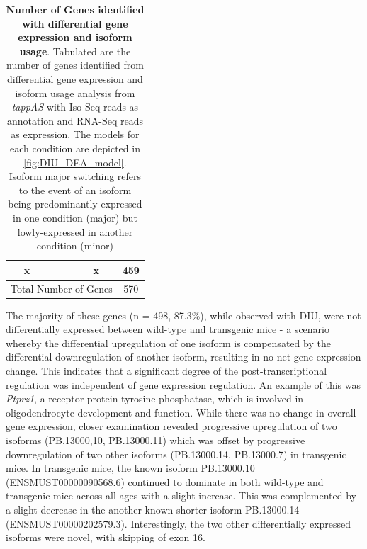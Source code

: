 \begin{table}[!htp]
\begin{tabularx}{0.85\textwidth}{cccc}
		x                                                                       & \checkmark                                                                    & x                                                                  & 459                              \\ \midrule
		\multicolumn{3}{c}{Total Number of Genes}                                                                                                                                                                            & 570                              \\ \bottomrule
	\end{tabularx}
	\caption[Number of Genes identified with differential gene expression and isoform usage]%
	{\textbf{Number of Genes identified with differential gene expression and isoform usage}. Tabulated are the number of genes identified from differential gene expression and isoform usage analysis from \textit{tappAS} with Iso-Seq reads as annotation and RNA-Seq reads as expression. The models for each condition are depicted in \cref{fig:DIU_DEA_model}. Isoform major switching refers to the event of an isoform being predominantly expressed in one condition (major) but lowly-expressed in another condition (minor)}
	\label{tab:DIU_DEA_nums}
\end{table}

The majority of these genes (n = 498, 87.3\%), while observed with DIU, were not differentially expressed between wild-type and transgenic mice - a scenario whereby the differential upregulation of one isoform is compensated by the differential downregulation of another isoform, resulting in no net gene expression change. This indicates that a significant degree of the post-transcriptional regulation was independent of gene expression regulation. An example of this was \textit{Ptprz1}, a receptor protein tyrosine phosphatase, which is involved in oligodendrocyte development and function. While there was no change in overall gene expression, closer examination revealed progressive upregulation of two isoforms (PB.13000,10, PB.13000.11) which was offset by progressive downregulation of two other isoforms (PB.13000.14, PB.13000.7) in transgenic mice. In transgenic mice, the known isoform PB.13000.10 (ENSMUST00000090568.6) continued to dominate in both wild-type and transgenic mice across all ages with a slight increase. This was complemented by a slight decrease in the another known shorter isoform PB.13000.14 (ENSMUST00000202579.3). Interestingly, the two other differentially expressed isoforms were novel, with skipping of exon 16. 

